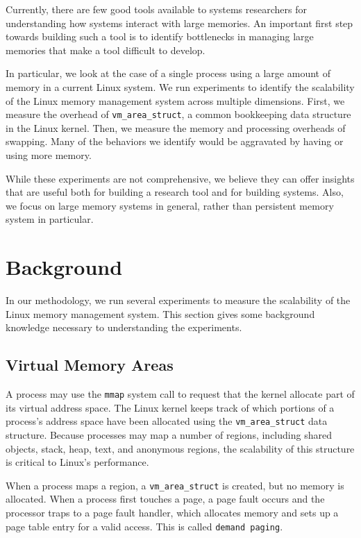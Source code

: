 \documentclass[twocolumn,11pt]{article}
\begin{document}
Currently, there are few good tools available to systems researchers for
understanding how systems interact with large memories. An important first step
towards building such a tool is to identify bottlenecks in managing large
memories that make a tool difficult to develop. 

In particular, we look at the case of a single process using a large amount of
memory in a current Linux system. We run experiments to identify the
scalability of the Linux memory management system across multiple dimensions.
First, we measure the overhead of \texttt{vm\_area\_struct}, a common
bookkeeping data structure in the Linux kernel. Then, we measure the memory and
processing overheads of swapping.  Many of the behaviors we identify would be
aggravated by having or using more memory.

While these experiments are not comprehensive, we believe they can offer
insights that are useful both for building a research tool and for building
systems. Also, we focus on large memory systems in general, rather than
persistent memory system in particular.


\section{Background}

In our methodology, we run several experiments to measure the scalability of
the Linux memory management system. This section gives some background knowledge
necessary to understanding the experiments.

\subsection{Virtual Memory Areas}

A process may use the \texttt{mmap} system call to request that the kernel
allocate part of its virtual address space.
The Linux kernel keeps track of which portions of a process's address space
have been allocated using the \texttt{vm\_area\_struct} data structure. Because
processes may map a number of regions, including shared objects, stack, heap,
text, and anonymous regions, the scalability of this structure is critical to
Linux's performance.

When a process maps a region, a \texttt{vm\_area\_struct} is created, but no
memory is allocated. When a process first touches a page, a page fault occurs
and the processor traps to a page fault handler, which allocates memory and
sets up a page table entry for a valid access. This is called \texttt{demand paging}.
\end{document}
